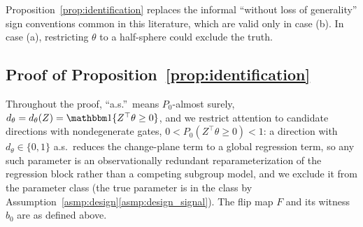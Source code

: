 \documentclass[11pt]{article}
\theoremstyle{definition}
\theoremstyle{plain}
\begin{document}
Proposition~\ref{prop:identification} replaces the informal ``without loss of generality'' sign conventions common in this literature, which are valid only in case (b). In case (a), restricting $\theta$ to a half-sphere could exclude the truth.

\subsection{Proof of Proposition~\ref{prop:identification}}\label{proof:prop:identification}

Throughout the proof, ``a.s.''\ means $P_0$-almost surely, $d_\theta=d_\theta(Z)=\mathbbm 1\{Z^\top\theta\ge0\}$, and we restrict attention to candidate directions with nondegenerate gates, $0<P_0(Z^\top\theta\ge0)<1$: a direction with $d_\theta\in\{0,1\}$ a.s.\ reduces the change-plane term to a global regression term, so any such parameter is an observationally redundant reparameterization of the regression block rather than a competing subgroup model, and we exclude it from the parameter class (the true parameter is in the class by Assumption~\ref{asmp:design}\ref{asmp:design_signal}). The flip map $F$ and its witness $b_0$ are as defined above.
\end{document}
